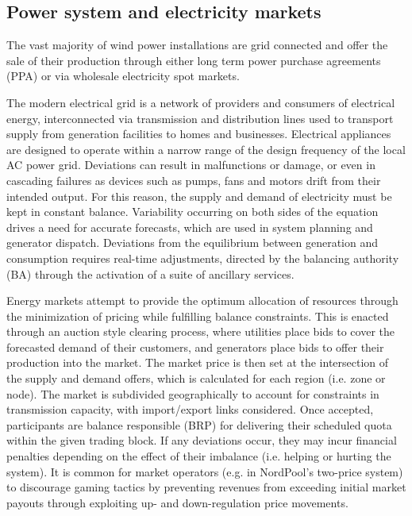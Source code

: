 \clearpage
\subsection{Power system and electricity markets}
\label{sec:intro_power_markets}

The vast majority of wind power installations are grid connected and offer the sale of their production through either long term power purchase agreements (PPA) or via wholesale electricity spot markets.

The modern electrical grid is a network of providers and consumers of electrical energy, interconnected via transmission and distribution lines used to transport supply from generation facilities to homes and businesses. Electrical appliances are designed to operate within a narrow range of the design frequency of the local AC power grid. Deviations can result in malfunctions or damage, or even in cascading failures as devices such as pumps, fans and motors drift from their intended output. For this reason, the supply and demand of electricity must be kept in constant balance. Variability occurring on both sides of the equation drives a need for accurate forecasts, which are used in system planning and generator dispatch. Deviations from the equilibrium between generation and consumption requires real-time adjustments, directed by the balancing authority (BA) through the activation of a suite of ancillary services.

Energy markets attempt to provide the optimum allocation of resources through the minimization of pricing while fulfilling balance constraints. This is enacted through an auction style clearing process, where utilities place bids to cover the forecasted demand of their customers, and generators place bids to offer their production into the market. The market price is then set at the intersection of the supply and demand offers, which is calculated for each region (i.e. zone or node). The market is subdivided geographically to account for constraints in transmission capacity, with import/export links considered. Once accepted, participants are balance responsible (BRP) for delivering their scheduled quota within the given trading block. If any deviations occur, they may incur financial penalties depending on the effect of their imbalance (i.e. helping or hurting the system). It is common for market operators (e.g. in NordPool's two-price system) to discourage gaming tactics by preventing revenues from exceeding initial market payouts through exploiting up- and down-regulation price movements.

